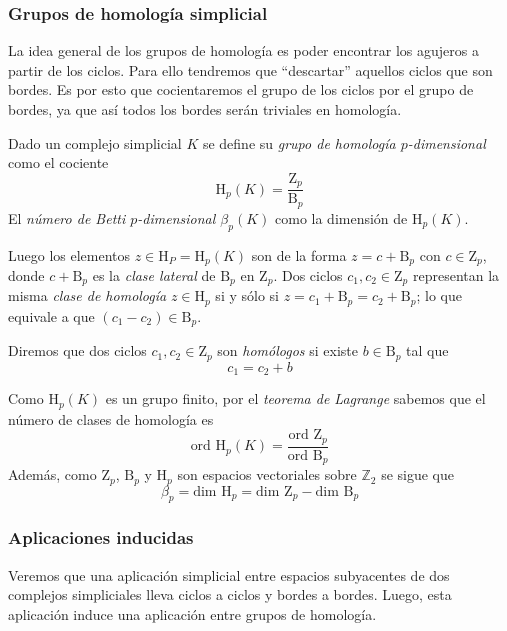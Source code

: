 \subsubsection*{Grupos de homología simplicial}
La idea general de los grupos de homología es poder encontrar los agujeros a partir de los ciclos. Para ello tendremos que ``descartar'' aquellos ciclos que son bordes. Es por esto que cocientaremos el grupo de los ciclos por el grupo de bordes, ya que así todos los bordes serán triviales en homología.

\begin{definition}
Dado un complejo simplicial $K$ se define su \emph{grupo de homología $p$-dimensional} como el cociente
\[
\text{H}_p(K)=\dfrac{\text{Z}_p}{\text{B}_p}
\]
El \emph{número de Betti $p$-dimensional $\beta_p(K)$} como la dimensión de $\text{H}_p(K)$. 
\end{definition}

Luego los elementos $z \in \text{H}_P = \text{H}_p(K)$ son de la forma $z = c + \text{B}_p$ con $c \in \text{Z}_p$, donde $c + \text{B}_p$ es la \emph{clase lateral} de $\text{B}_p$ en $\text{Z}_p$. Dos ciclos $c_1, c_2 \in \text{Z}_p$ representan la misma \emph{clase de homología} $z \in \text{H}_p$ si y sólo si $z= c_1 + \text{B}_p = c_2 + \text{B}_p$; lo que equivale a que $(c_1-c_2) \in \text{B}_p$.

\begin{definition}
Diremos que dos ciclos $c_1, c_2 \in \text{Z}_p$ son \emph{homólogos} si existe $b \in \text{B}_p$ tal que 
\[
c_1 = c_2 + b
\]
\end{definition}

Como $\text{H}_p(K)$ es un grupo finito, por el \emph{teorema de Lagrange} sabemos que el número de clases de homología es
\[
\text{ord } \text{H}_p(K) = \dfrac{\text{ord }  \text{Z}_p}{\text{ord } \text{B}_p}
\]
Además, como $\text{Z}_p$, $\text{B}_p$ y $\text{H}_p$ son espacios vectoriales sobre $\mathbb{Z}_2$ se sigue que 
\[
\beta_p = \text{dim } \text{H}_p = \text{dim } \text{Z}_p - \text{dim } \text{B}_p
\] 

\subsubsection*{Aplicaciones inducidas}
Veremos que una aplicación simplicial entre espacios subyacentes de dos complejos simpliciales lleva ciclos a ciclos y bordes a bordes. Luego, esta aplicación induce una aplicación entre grupos de homología.

